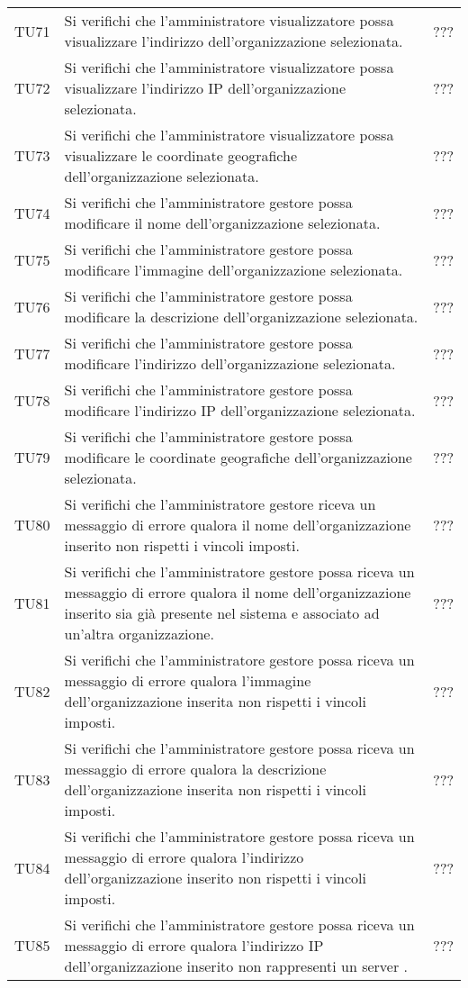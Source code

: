 {\begin{longtable}{ c  C{9cm} C{1cm}}
TU71 & Si verifichi che l'amministratore visualizzatore possa visualizzare l’indirizzo dell'organizzazione selezionata. & ??? \\
TU72 & Si verifichi che l'amministratore visualizzatore possa visualizzare l’indirizzo IP dell'organizzazione selezionata. & ??? \\
TU73 & Si verifichi che l'amministratore visualizzatore possa visualizzare le coordinate geografiche dell'organizzazione selezionata. & ??? \\
TU74 & Si verifichi che l'amministratore gestore possa modificare il nome dell'organizzazione selezionata. & ??? \\
TU75 & Si verifichi che l'amministratore gestore possa modificare l’immagine dell'organizzazione selezionata. & ??? \\
TU76 & Si verifichi che l'amministratore gestore possa modificare la descrizione dell'organizzazione selezionata. & ??? \\
TU77 & Si verifichi che l'amministratore gestore possa modificare l’indirizzo dell'organizzazione selezionata. & ??? \\
TU78 & Si verifichi che l'amministratore gestore possa modificare l’indirizzo IP dell'organizzazione selezionata. & ??? \\
TU79 & Si verifichi che l'amministratore gestore possa modificare le coordinate geografiche dell'organizzazione selezionata. & ??? \\
TU80 & Si verifichi che l'amministratore gestore riceva un messaggio di errore qualora il nome dell'organizzazione inserito non rispetti i vincoli imposti. & ??? \\
TU81 & Si verifichi che l'amministratore gestore possa riceva un messaggio di errore qualora il nome dell'organizzazione inserito sia già presente nel sistema e associato ad un'altra organizzazione. & ??? \\
TU82 & Si verifichi che l'amministratore gestore possa riceva un messaggio di errore qualora l'immagine dell'organizzazione inserita non rispetti i vincoli imposti. & ??? \\
TU83 & Si verifichi che l'amministratore gestore possa riceva un messaggio di errore qualora la descrizione dell'organizzazione inserita non rispetti i vincoli imposti. & ??? \\
TU84 & Si verifichi che l'amministratore gestore possa riceva un messaggio di errore qualora l'indirizzo dell'organizzazione inserito non rispetti i vincoli imposti. & ??? \\
TU85 & Si verifichi che l'amministratore gestore possa riceva un messaggio di errore qualora l'indirizzo IP dell'organizzazione inserito non rappresenti un server . & ??? \\

\end{longtable}}
